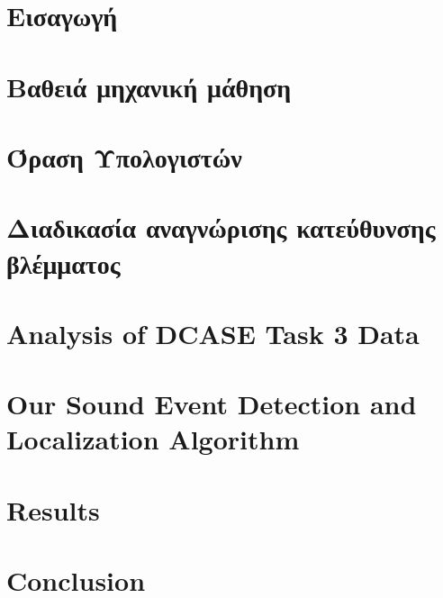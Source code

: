 \documentclass[english, a4paper, 12pt, oneside]{book}
\numberwithin{equation}{section} %
\begin{document}
\chapter{Εισαγωγή} %
\label{intro}
\clearpage %


\chapter{Βαθειά μηχανική μάθηση}
\label{deep}
    
\clearpage


\chapter{Όραση Υπολογιστών}
\label{vision}
    
\clearpage

\chapter{Διαδικασία αναγνώρισης κατεύθυνσης βλέμματος}
\label{DCASE}
    
\clearpage

\chapter{Analysis of DCASE Task 3 Data}
\label{analysis}
    
\clearpage
  
\chapter{Our Sound Event Detection and Localization Algorithm}
\label{method}
    
\clearpage 

\chapter{Results}
\label{results}
    
\clearpage

\chapter{Conclusion}
\label{conclusion}
    
\clearpage
\end{document}
